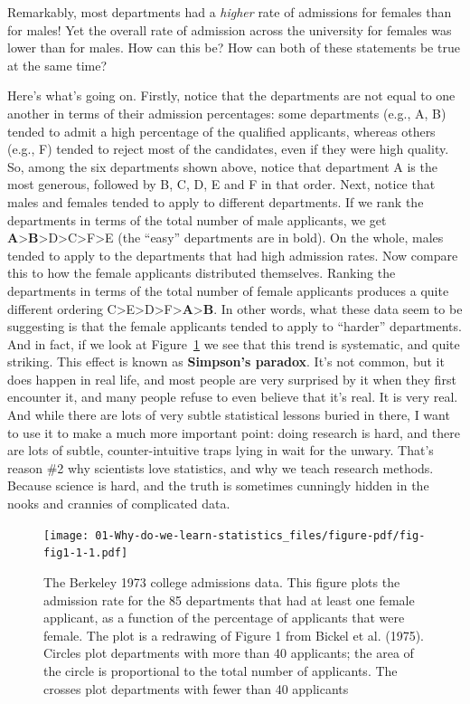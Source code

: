 \documentclass[
  a4paper,
]{book}
\begin{document}
Remarkably, most departments had a \emph{higher} rate of admissions for
females than for males! Yet the overall rate of admission across the
university for females was lower than for males. How can this be? How
can both of these statements be true at the same time?

Here's what's going on. Firstly, notice that the departments are not
equal to one another in terms of their admission percentages: some
departments (e.g., A, B) tended to admit a high percentage of the
qualified applicants, whereas others (e.g., F) tended to reject most of
the candidates, even if they were high quality. So, among the six
departments shown above, notice that department A is the most generous,
followed by B, C, D, E and F in that order. Next, notice that males and
females tended to apply to different departments. If we rank the
departments in terms of the total number of male applicants, we get
\textbf{A}\textgreater{}\textbf{B}\textgreater D\textgreater C\textgreater F\textgreater E
(the ``easy'' departments are in bold). On the whole, males tended to
apply to the departments that had high admission rates. Now compare this
to how the female applicants distributed themselves. Ranking the
departments in terms of the total number of female applicants produces a
quite different ordering
C\textgreater E\textgreater D\textgreater F\textgreater{}\textbf{A}\textgreater{}\textbf{B}.
In other words, what these data seem to be suggesting is that the female
applicants tended to apply to ``harder'' departments. And in fact, if we
look at Figure~\ref{fig-fig1-1} we see that this trend is systematic,
and quite striking. This effect is known as \textbf{Simpson's paradox}.
It's not common, but it does happen in real life, and most people are
very surprised by it when they first encounter it, and many people
refuse to even believe that it's real. It is very real. And while there
are lots of very subtle statistical lessons buried in there, I want to
use it to make a much more important point: doing research is hard, and
there are lots of subtle, counter-intuitive traps lying in wait for the
unwary. That's reason \#2 why scientists love statistics, and why we
teach research methods. Because science is hard, and the truth is
sometimes cunningly hidden in the nooks and crannies of complicated
data.

\begin{figure}[h!]

\texttt{[image: 01-Why-do-we-learn-statistics\_files/figure-pdf/fig-fig1-1-1.pdf]} \hfill{}

\caption{\label{fig-fig1-1}The Berkeley 1973 college admissions data.
This figure plots the admission rate for the 85 departments that had at
least one female applicant, as a function of the percentage of
applicants that were female. The plot is a redrawing of Figure 1 from
Bickel et al. (1975). Circles plot departments with more than 40
applicants; the area of the circle is proportional to the total number
of applicants. The crosses plot departments with fewer than 40
applicants}

\end{figure}
\end{document}
